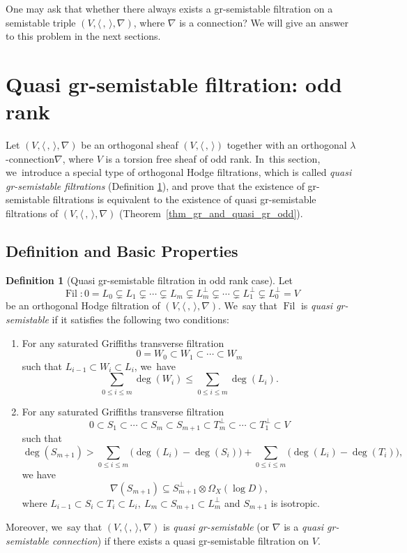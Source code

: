 \documentclass[11pt]{article}
\newcommand{\Subsection}{\subsection}
\numberwithin{equation}{section}
\newcommand{\lconnection}{$\lambda$\nobreakdash-con\-nec\-tion\xspace}
\newcommand{\grsemistable}{gr\nobreakdash-semi\-stable\xspace}
\DeclareMathOperator{\Filt}{Fil}
\theoremstyle{plain}
\theoremstyle{definition}
\newtheorem{defn}[thm]{Definition}
\begin{document}
One may ask that whether there always exists a \grsemistable filtration on a semistable triple $(V, \langle \,,\, \rangle,\nabla)$, where $\nabla$ is a connection? We will give an answer to this problem in the next sections.

\section{Quasi \texorpdfstring{\protect\grsemistable}{grsemistable} filtration: odd rank}\label{sect_odd}

Let $(V, \langle \,, \, \rangle, \nabla)$ be an orthogonal sheaf $(V, \langle \,, \, \rangle)$ together with an orthogonal \lconnection $\nabla$, where $V$ is a torsion free sheaf of odd rank. In~this section, we~introduce a special type of orthogonal Hodge filtrations, which is called \emph{quasi \grsemistable filtrations} (Definition \ref{defn_gr_semi_odd}), and prove that the existence of \grsemistable filtrations is equivalent to the existence of quasi \grsemistable filtrations of $(V, \langle \,, \, \rangle, \nabla)$ (Theorem~\ref{thm_gr_and_quasi_gr_odd}).

\Subsection{Definition and Basic Properties}

\begin{defn}[{Quasi \grsemistable filtration in odd rank case}]\label{defn_gr_semi_odd}
Let
\[
\Filt: 0= L_0 \subsetneq L_1 \subsetneq \cdots \subsetneq L_m \subsetneq L_m^\perp\subsetneq\cdots \subsetneq L_1^\perp\subsetneq L_0^\perp= V
\]
be an orthogonal Hodge filtration of $(V, \langle \,, \, \rangle, \nabla)$. We~say that $\Filt$ is \emph{quasi \grsemistable} if it satisfies the following two conditions:

\begin{enumerate}\renewcommand{\theenumi}{\Roman{enumi}}
\item\label{cond:I}
For any saturated Griffiths transverse filtration
\[
0=W_0\subset W_1 \subset \cdots\subset W_m
\]
such that $L_{i-1}\subset W_i\subset L_i$, we~have
\[
\sum_{0\leq i\leq m}\deg(W_i)\leqslant\sum_{0\leq i\leq m}\deg(L_i).
\]

\item\label{cond:II}
For any saturated Griffiths transverse filtration
\[
0\subset S_1 \subset \cdots\subset S_m\subset S_{m+1}\subset T_m^\perp\subset\cdots \subset T_1^\perp\subset V
\]
such that
\[
\deg(S_{m+1})>\sum_{0\leq i\leq m}\big(\deg(L_i)-\deg(S_i)\big)+\sum_{0\leq i\leq m}\big(\deg(L_i)-\deg(T_i)\big),
\]
we have
\[
\nabla(S_{m+1})\subseteq S_{m+1}^\perp \otimes\Omega_X(\log D),
\]
where $L_{i-1}\subset S_i \subset T_i \subset L_i,\ L_m\subset S_{m+1}\subset L_m^\perp$ and $S_{m+1}$ is isotropic.
\end{enumerate}
Moreover, we~say that $(V,\langle \,, \, \rangle,\nabla)$ is \emph{quasi \grsemistable} (or $\nabla$ is a \emph{quasi \grsemistable connection}) if there exists a quasi \grsemistable filtration on $V$.
\end{defn}
\end{document}
